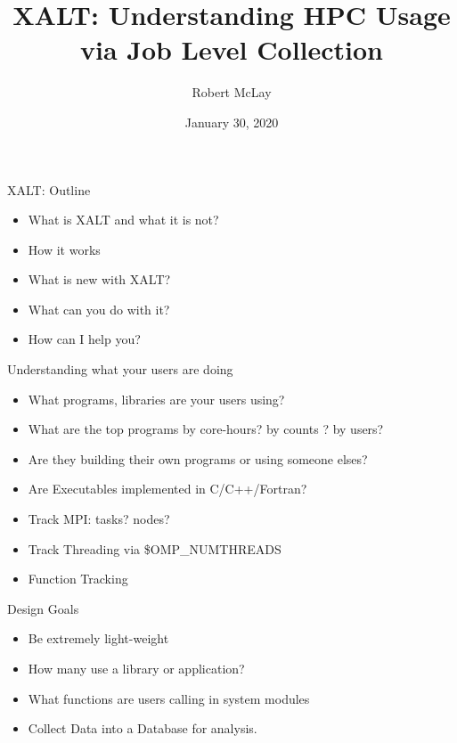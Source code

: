 \documentclass{beamer}
\begin{document}
\title[XALT]{XALT: Understanding HPC Usage via Job Level Collection}
\author{Robert McLay} 
\date{January 30, 2020} 

\frame{\titlepage} 

\begin{frame}{XALT: Outline}

  \begin{itemize}
    \item What is XALT and what it is not?
    \item How it works
    \item What is new with XALT?
    \item What can you do with it?
    \item How can I help you?
  \end{itemize}
\end{frame}

\begin{frame}{Understanding what your users are doing}
  \begin{itemize}
    \item What programs, libraries are your users using?
    \item What are the top programs by core-hours? by counts ? by users?
    \item Are they building their own programs or using someone elses?
    \item Are Executables implemented in C/C++/Fortran?
    \item Track MPI: tasks? nodes?
    \item Track Threading via \$OMP\_NUMTHREADS
    \item Function Tracking
  \end{itemize}
\end{frame}

\begin{frame}{Design Goals}
  \begin{itemize}
    \item Be extremely light-weight
    \item How many use a library or application?
    \item What functions are users calling in system modules
    \item Collect Data into a Database for analysis.
  \end{itemize}
\end{frame}
\end{document}
